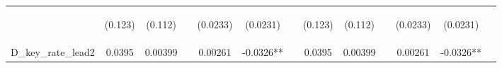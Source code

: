 \documentclass[]{article}
\begin{document}
\begin{center}
\begin{tabular}{lcccccccccccc}
\vspace{4pt} & \begin{footnotesize}(0.123)\end{footnotesize} & \begin{footnotesize}(0.112)\end{footnotesize} & \begin{footnotesize}\end{footnotesize} & \begin{footnotesize}(0.0233)\end{footnotesize} & \begin{footnotesize}(0.0231)\end{footnotesize} & \begin{footnotesize}\end{footnotesize} & \begin{footnotesize}(0.123)\end{footnotesize} & \begin{footnotesize}(0.112)\end{footnotesize} & \begin{footnotesize}\end{footnotesize} & \begin{footnotesize}(0.0233)\end{footnotesize} & \begin{footnotesize}(0.0231)\end{footnotesize} & \begin{footnotesize}\end{footnotesize} \\
D\_key\_rate\_lead2 & 0.0395 & 0.00399 &  & 0.00261 & -0.0326** &  & 0.0395 & 0.00399 &  & 0.00261 & -0.0326** &  \\

\end{tabular}
\end{center}
\end{document}
